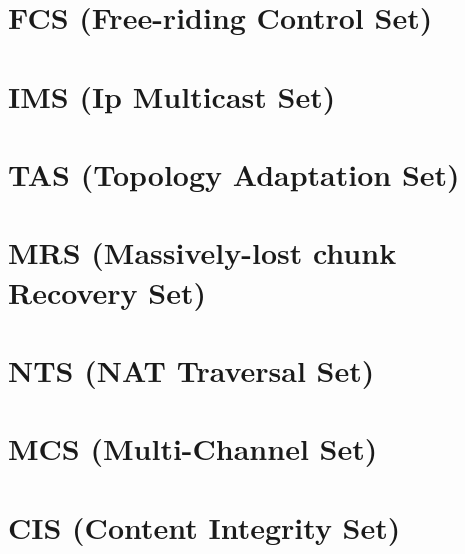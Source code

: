 \section{FCS (Free-riding Control Set)}


\section{IMS (Ip Multicast Set)}


\section{TAS (Topology Adaptation Set)}


\section{MRS (Massively-lost chunk Recovery Set)}


\section{NTS (NAT Traversal Set)}


\section{MCS (Multi-Channel Set)}


\section{CIS (Content Integrity Set)}


%

\printglossary[type=\acronymtype]

\printglossary


